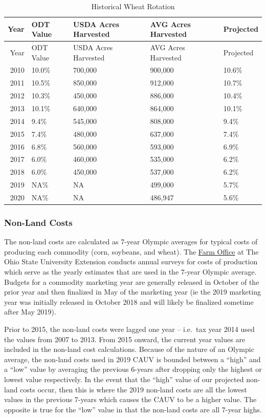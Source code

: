 \documentclass[]{article}
\begin{document}
\begin{longtable}[]{@{}rllll@{}}
\caption{Historical Wheat Rotation}\tabularnewline
\toprule
Year & ODT Value & USDA Acres Harvested & AVG Acres Harvested &
Projected\tabularnewline
\midrule
\endfirsthead
\toprule
Year & ODT Value & USDA Acres Harvested & AVG Acres Harvested &
Projected\tabularnewline
\midrule
\endhead
2010 & 10.0\% & 700,000 & 900,000 & 10.6\%\tabularnewline
2011 & 10.5\% & 850,000 & 912,000 & 10.7\%\tabularnewline
2012 & 10.3\% & 450,000 & 886,000 & 10.4\%\tabularnewline
2013 & 10.1\% & 640,000 & 864,000 & 10.1\%\tabularnewline
2014 & 9.4\% & 545,000 & 808,000 & 9.4\%\tabularnewline
2015 & 7.4\% & 480,000 & 637,000 & 7.4\%\tabularnewline
2016 & 6.8\% & 560,000 & 593,000 & 6.9\%\tabularnewline
2017 & 6.0\% & 460,000 & 535,000 & 6.2\%\tabularnewline
2018 & 6.0\% & 450,000 & 537,000 & 6.2\%\tabularnewline
2019 & NA\% & NA & 499,000 & 5.7\%\tabularnewline
2020 & NA\% & NA & 486,947 & 5.6\%\tabularnewline
\bottomrule
\end{longtable}

\hypertarget{non-land-costs}{%
\subsubsection{Non-Land Costs}\label{non-land-costs}}

The non-land costs are calculated as 7-year Olympic averages for typical
costs of producing each commodity (corn, soybeans, and wheat). The
\href{https://farmoffice.osu.edu/farm-management-tools/farm-budgets}{Farm
Office} at The Ohio State University Extension conducts annual surveys
for costs of production which serve as the yearly estimates that are
used in the 7-year Olympic average. Budgets for a commodity marketing
year are generally released in October of the prior year and then
finalized in May of the marketing year (ie the 2019 marketing year was
initially released in October 2018 and will likely be finalized sometime
after May 2019).

Prior to 2015, the non-land costs were lagged one year -- i.e.~tax year
2014 used the values from 2007 to 2013. From 2015 onward, the current
year values are included in the non-land cost calculations. Because of
the nature of an Olympic average, the non-land costs used in 2019 CAUV
is bounded between a ``high'' and a ``low'' value by averaging the
previous 6-years after dropping only the highest or lowest value
respectively. In the event that the ``high'' value of our projected
non-land costs occur, then this is where the 2019 non-land costs are all
the lowest values in the previous 7-years which causes the CAUV to be a
higher value. The opposite is true for the ``low'' value in that the
non-land costs are all 7-year highs.
\end{document}
